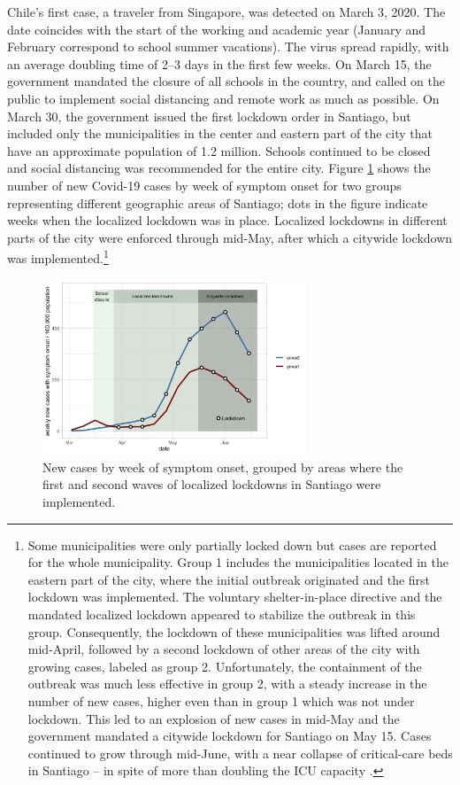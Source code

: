 Chile's first case, a traveler from Singapore, was detected on March 3, 2020.  The date coincides with the start of the working and academic year (January and February correspond to school summer vacations). The virus spread rapidly, with an average doubling time of 2--3 days in the first few weeks. On March 15, the government mandated the closure of all schools in the country, and called on the public to implement social distancing and remote work as much as possible. On March 30, the government issued the first lockdown order in Santiago, but included only the municipalities in the center and eastern part of the city that have an approximate population of 1.2 million. Schools continued to be closed and social distancing was recommended for the entire city. 
Figure \ref{fig:cases_group} shows the number of new Covid-19 cases by week of symptom onset for two groups representing different geographic areas of Santiago; dots in the figure indicate weeks when the localized lockdown was in place. Localized lockdowns in different parts of the city were enforced through mid-May, after which a citywide lockdown was implemented.\footnote{Some municipalities  were only partially locked down but cases are reported for the whole municipality. Group 1 includes the municipalities located in the eastern part of the city, where the initial outbreak originated and the first lockdown was implemented. The voluntary shelter-in-place directive and the mandated localized lockdown appeared to stabilize the outbreak in this group. Consequently, the lockdown of these municipalities was lifted around mid-April, followed by a second lockdown of other areas of the city with growing cases, labeled as group 2. Unfortunately, the containment of the outbreak was much less effective in group 2, with a steady increase in the number of new cases, higher even than in group 1 which was not under lockdown. This led to an explosion of new cases in mid-May and the government mandated a citywide lockdown for Santiago on May 15. Cases continued to grow through mid-June, with a near collapse of critical-care beds in Santiago -- in spite of more than doubling the ICU capacity \citep{goic2021covid}.}

\begin{figure}[htb]
    \centering
    \includegraphics[width=0.7\textwidth]{imagenes/figs_tabs_pandemic/PNASFig1.png}
    \caption{New cases by week of symptom onset, grouped by areas where the first and second waves of localized lockdowns in Santiago were implemented.}
    \label{fig:cases_group}
\end{figure}


